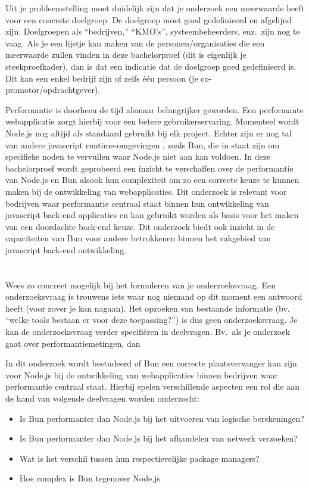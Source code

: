 Uit je probleemstelling moet duidelijk zijn dat je onderzoek een meerwaarde heeft voor een concrete doelgroep. 
De doelgroep moet goed gedefinieerd en afgelijnd zijn. Doelgroepen als ``bedrijven,'' ``KMO's'', systeembeheerders, enz.~zijn nog te vaag. 
Als je een lijstje kan maken van de personen/organisaties die een meerwaarde zullen vinden in deze bachelorproef (dit is eigenlijk je steekproefkader), 
dan is dat een indicatie dat de doelgroep goed gedefinieerd is. Dit kan een enkel bedrijf zijn of zelfs één persoon (je co-promotor/opdrachtgever).

Performantie is doorheen de tijd alsmaar belangrijker geworden. 
Een performante webapplicatie zorgt hierbij voor een betere gebruikerservaring. 
Momenteel wordt Node.js nog altijd als standaard gebruikt bij elk project. Echter zijn er nog tal van andere javascript runtime-omgevingen
, zoals Bun, die in staat zijn om specifieke noden te vervullen waar Node.js niet aan kan voldoen. In deze bachelorproef wordt geprobeerd 
een inzicht te verschaffen over de performantie van Node.js en Bun alsook hun complexiteit 
om zo een correcte keuze te kunnen maken bij de ontwikkeling van webapplicaties.
Dit onderzoek is relevant voor bedrijven waar performantie centraal staat binnen hun ontwikkeling van javascript back-end applicaties en kan gebruikt worden als basis 
voor het maken van een doordachte back-end keuze. Dit onderzoek 
biedt ook inzicht in de capaciteiten van Bun voor andere betrokkenen binnen het vakgebied van javascript back-end ontwikkeling.

\section{}%
\label{sec:onderzoeksvraag}

Wees zo concreet mogelijk bij het formuleren van je onderzoeksvraag. 
Een onderzoeksvraag is trouwens iets waar nog niemand op dit moment een antwoord heeft
 (voor zover je kan nagaan). Het opzoeken van bestaande informatie (bv. ``welke tools bestaan er voor deze toepassing?'') is dus geen onderzoeksvraag. 
Je kan de onderzoeksvraag verder specifiëren in deelvragen. 
Bv.~als je onderzoek gaat over performantiemetingen, dan 

In dit onderzoek wordt bestudeerd of Bun 
een correcte plaatsvervanger kan zijn voor Node.js bij de ontwikkeling van webapplicaties binnen bedrijven 
waar performantie centraal staat.
Hierbij spelen verschillende aspecten een rol die aan de hand van volgende deelvragen worden onderzocht:
\begin{itemize}
  \item Is Bun performanter dan Node.js bij het uitvoeren van logische berekeningen?
  \item Is Bun performanter dan Node.js bij het afhandelen van netwerk verzoeken?
  \item Wat is het verschil tussen hun respectievelijke package managers?
  \item Hoe complex is Bun tegenover Node.js
\end{itemize}


